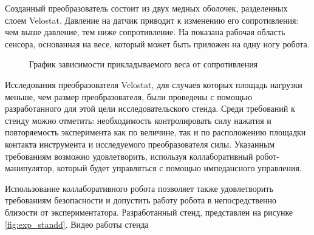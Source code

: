 Созданный преобразователь состоит из двух медных оболочек, разделенных слоем Velostat. Давление на датчик приводит к изменению его сопротивления: чем выше давление, тем ниже сопротивление. На  показана рабочая область сенсора, основанная на весе, который может быть приложен на одну ногу робота.
\begin{figure}[h]
    \centering
    \caption{График зависимости прикладываемого веса от сопротивления}
    \label{fig:velostat_pressure_resistance.jpg}
\end{figure}

Исследования преобразователя Velostat, для случаев которых площадь нагрузки меньше, чем размер преобразователя, были проведены с помощью разработанного для этой цели исследовательского стенда. Среди требований к стенду можно отметить: необходимость контролировать силу нажатия и повторяемость эксперимента как по величине, так и по расположению площадки контакта инструмента и исследуемого преобразователя силы. Указанным требованиям возможно удовлетворить, используя коллаборативный робот-манипулятор, который будет управляться с помощью импедансного управления.

Использование коллаборативного робота позволяет также удовлетворить требованиям безопасности и допустить работу робота в непосредственно близости от экспериментатора. Разработанный стенд, представлен на рисунке \ref{fig:exp_standd}. Видео работы стенда \quad {}

